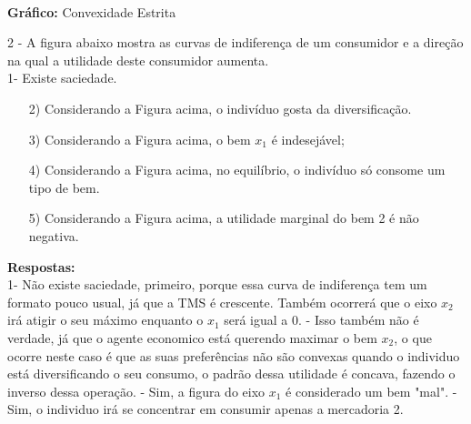 \documentclass[a4paper, 12pt]{article} %
\begin{document}
\begin{flushleft}
\begin{center}
\\
\textbf{Gráfico:} Convexidade Estrita
\end{center}
\singlespacing

2 - A figura abaixo mostra as curvas de indiferença de um consumidor e a direção na qual a utilidade deste
consumidor aumenta.
\\
1- Existe saciedade.
\\
\begin{center}
			\end{center}
			\label{anpect2004_consumidor}
\begin{itemize}

\item[2)] Considerando a Figura acima, o indivíduo gosta da diversificação.
		\item[3)] Considerando a Figura acima, o bem $x_1$ é indesejável;
		\item[4)] Considerando a Figura acima, no equilíbrio, o indivíduo só consome um tipo de bem.
		\item[5)] Considerando a Figura acima, a utilidade marginal do bem 2 é não negativa.
		\end{itemize}

\textbf{Respostas:}
\\
1- Não existe saciedade, primeiro, porque essa curva de indiferença tem um formato pouco usual, já que a TMS é crescente. Também ocorrerá que o eixo $x_2$ irá atigir o seu máximo enquanto o $x_1$ será igual a 0.
- Isso também não é verdade, já que o agente economico está querendo maximar o bem $x_2$, o que ocorre neste caso é que as suas preferências não são convexas quando o individuo está diversificando o seu consumo, o padrão dessa utilidade é concava, fazendo o inverso dessa operação.
- Sim, a figura do eixo $x_1$ é considerado um bem "mal".
- Sim, o individuo irá se concentrar em consumir apenas a mercadoria 2.
\singlespacing



\end{flushleft}
\end{document}
